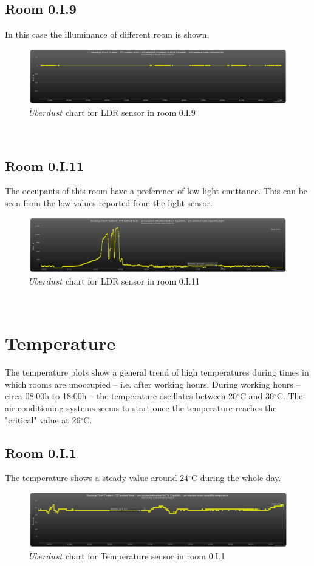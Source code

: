 \documentclass[12pt,a4paper]{report}
\begin{document}
\subsection{Room 0.I.9}
%
In this case the illuminance of different room is shown.
\begin{figure}[H]
\centering
	\includegraphics*[width=\textwidth]{pir_9}
	\caption{$\ddot{U}berdust$ chart for LDR sensor in room 0.I.9}
	\label{chart_light_9}
\end{figure}
\ \\
%
\subsection{Room 0.I.11}
%
The occupants of this room have a preference of low light emittance.
This can be seen from the low values reported from the light sensor.
\begin{figure}[H]
\centering
	\includegraphics*[width=\textwidth]{light_11}
	\caption{$\ddot{U}berdust$ chart for LDR sensor in room 0.I.11}
	\label{chart_light_11}
\end{figure}
\ \\
%
\section{Temperature}
%
The temperature plots show a general trend of high temperatures during times in which rooms are unoccupied -- i.e. after working hours.
During working hours -- circa 08:00h to 18:00h -- the temperature oscillates between 20$^\circ$C and 30$^\circ$C.
The air conditioning systems seems to start once the temperature reaches the "critical" value at 26$^\circ$C.
\subsection{Room 0.I.1}
%
The temperature shows a steady value around 24$^\circ$C during the whole day.
\begin{figure}[H]
\centering
	\includegraphics*[width=\textwidth]{temp_1}
	\caption{$\ddot{U}berdust$ chart for Temperature sensor in room 0.I.1}
	\label{chart_temp_1}
\end{figure}
\ \\
%
\end{document}
